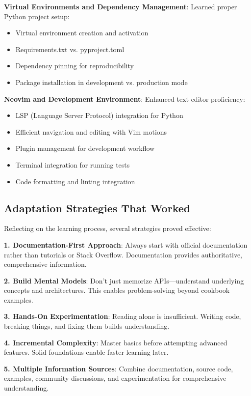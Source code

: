 \documentclass[12pt,a4paper,oneside]{report}
\begin{document}
\textbf{Virtual Environments and Dependency Management}: Learned proper Python project setup:
\begin{itemize}
    \item Virtual environment creation and activation
    \item Requirements.txt vs. pyproject.toml
    \item Dependency pinning for reproducibility
    \item Package installation in development vs. production mode
\end{itemize}

\textbf{Neovim and Development Environment}: Enhanced text editor proficiency:
\begin{itemize}
    \item LSP (Language Server Protocol) integration for Python
    \item Efficient navigation and editing with Vim motions
    \item Plugin management for development workflow
    \item Terminal integration for running tests
    \item Code formatting and linting integration
\end{itemize}

\subsection{Adaptation Strategies That Worked}

Reflecting on the learning process, several strategies proved effective:

\textbf{1. Documentation-First Approach}: Always start with official documentation rather than tutorials or Stack Overflow. Documentation provides authoritative, comprehensive information.

\textbf{2. Build Mental Models}: Don't just memorize APIs---understand underlying concepts and architectures. This enables problem-solving beyond cookbook examples.

\textbf{3. Hands-On Experimentation}: Reading alone is insufficient. Writing code, breaking things, and fixing them builds understanding.

\textbf{4. Incremental Complexity}: Master basics before attempting advanced features. Solid foundations enable faster learning later.

\textbf{5. Multiple Information Sources}: Combine documentation, source code, examples, community discussions, and experimentation for comprehensive understanding.
\end{document}
